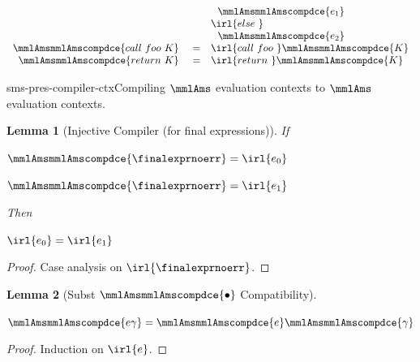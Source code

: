\documentclass[a4paper,names,dvipsnames]{article}
\newtheorem{lemma}{Lemma}
\begin{document}
{\begin{center}
$$\begin{array}{rll}
                               &&\ \ \mmlAmsmmlAmscompdce{e_{1}}\\
                               &&\irl{else\ }\\
                               &&\ \ \mmlAmsmmlAmscompdce{e_{2}} \\
      \mmlAmsmmlAmscompdce{call\ foo\ K} &\ = & \irl{call\ foo\ }\mmlAmsmmlAmscompdce{K}\\
      \mmlAmsmmlAmscompdce{return\ K} &\ = & \irl{return\ }\mmlAmsmmlAmscompdce{K}\\
    \end{array}
    $$
  \end{center}
}{sms-pres-compiler-ctx}{Compiling $\mmlAms$ evaluation contexts to $\mmlAms$ evaluation contexts.}

\begin{lemma}[Injective Compiler (for final expressions)]\label{lem:smscomp:inject}
  If
  \begin{assumptions}
    \item $\mmlAmsmmlAmscompdce{\finalexprnoerr}=\irl{e_0}$
    \item $\mmlAmsmmlAmscompdce{\finalexprnoerr}=\irl{e_1}$
  \end{assumptions}
  Then
  \begin{goals}
    \item $\irl{e_0}=\irl{e_1}$
  \end{goals}
\end{lemma}
\begin{proof}
  Case analysis on $\irl{\finalexprnoerr}$.
\end{proof}

\begin{lemma}[Subst $\mmlAmsmmlAmscompdce{\bullet}$ Compatibility]\label{thm:mscomp:subst:compat}
  $\;$
  \begin{goals}
    \item $\mmlAmsmmlAmscompdce{e\gamma}=\mmlAmsmmlAmscompdce{e}\mmlAmsmmlAmscompdce{\gamma}$
  \end{goals}
\end{lemma}
\begin{proof}
  Induction on $\irl{e}$.
\end{proof}
\end{document}
